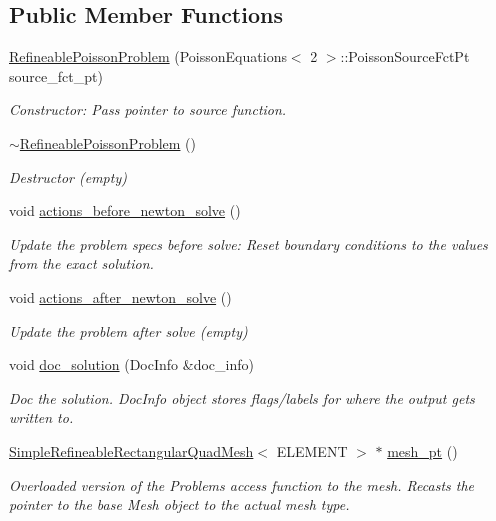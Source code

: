 \subsection*{Public Member Functions}
\begin{DoxyCompactItemize}
\item 
\hyperlink{classRefineablePoissonProblem_a019ec586c38163e04e177de92503c02f}{Refineable\+Poisson\+Problem} (Poisson\+Equations$<$ 2 $>$\+::Poisson\+Source\+Fct\+Pt source\+\_\+fct\+\_\+pt)
\begin{DoxyCompactList}\small\item\em Constructor\+: Pass pointer to source function. \end{DoxyCompactList}\item 
\hyperlink{classRefineablePoissonProblem_a84980680d8a6576e14af42a8639d391a}{$\sim$\+Refineable\+Poisson\+Problem} ()
\begin{DoxyCompactList}\small\item\em Destructor (empty) \end{DoxyCompactList}\item 
void \hyperlink{classRefineablePoissonProblem_a883906ab6c06ffa10ed55dc4fc02ce96}{actions\+\_\+before\+\_\+newton\+\_\+solve} ()
\begin{DoxyCompactList}\small\item\em Update the problem specs before solve\+: Reset boundary conditions to the values from the exact solution. \end{DoxyCompactList}\item 
void \hyperlink{classRefineablePoissonProblem_ac4d433dad09bce5bd9be21e86d347e38}{actions\+\_\+after\+\_\+newton\+\_\+solve} ()
\begin{DoxyCompactList}\small\item\em Update the problem after solve (empty) \end{DoxyCompactList}\item 
void \hyperlink{classRefineablePoissonProblem_aaf9482084473a6ca2bd0de24acae08e9}{doc\+\_\+solution} (Doc\+Info \&doc\+\_\+info)
\begin{DoxyCompactList}\small\item\em Doc the solution. Doc\+Info object stores flags/labels for where the output gets written to. \end{DoxyCompactList}\item 
\hyperlink{classSimpleRefineableRectangularQuadMesh}{Simple\+Refineable\+Rectangular\+Quad\+Mesh}$<$ E\+L\+E\+M\+E\+NT $>$ $\ast$ \hyperlink{classRefineablePoissonProblem_ad8148aada59e279cbd9eb34272b65fa5}{mesh\+\_\+pt} ()
\begin{DoxyCompactList}\small\item\em Overloaded version of the Problem\textquotesingle{}s access function to the mesh. Recasts the pointer to the base Mesh object to the actual mesh type. \end{DoxyCompactList}\end{DoxyCompactItemize}
